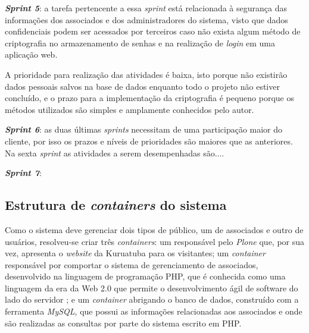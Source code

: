\textbf{\textit{Sprint 5}}: a tarefa pertencente a essa \textit{sprint} está relacionada à segurança das informações dos associados e dos administradores do sistema, visto que dados confidenciais podem ser acessados por terceiros caso não exista algum método de criptografia no armazenamento de senhas e na realização de \textit{login} em uma aplicação web.

A prioridade para realização das atividades é baixa, isto porque não existirão dados pessoais salvos na base de dados enquanto todo o projeto não estiver concluído, e o prazo para a implementação da criptografia é pequeno porque os métodos utilizados são simples e amplamente conhecidos pelo autor.

\textbf{\textit{Sprint 6}}: as duas últimas \textit{sprints} necessitam de uma participação maior do cliente, por isso os prazos e níveis de prioridades são maiores que as anteriores. Na sexta \textit{sprint} as atividades a serem desempenhadas são.... 

\textbf{\textit{Sprint 7}}:






\hspace{2.5cm}
\subsection{Estrutura de \textit{containers} do sistema}
\label{subsec:docker}
\hspace{2.5cm}

Como o sistema deve gerenciar dois tipos de público, um de associados e outro de usuários, resolveu-se criar três \textit{containers}: um responsável pelo \textit{Plone} que, por sua vez, apresenta o \textit{website} da Kuruatuba para os visitantes; um \textit{container} responsável por comportar o sistema de gerenciamento de associados, desenvolvido na linguagem de programação PHP, que é conhecida como uma linguagem da era da Web 2.0 que permite o desenvolvimento ágil de software do lado do servidor ; e um \textit{container} abrigando o banco de dados, construído com a ferramenta \textit{MySQL}, que possui as informações relacionadas aos associados e onde são realizadas as consultas por parte do sistema escrito em PHP.

